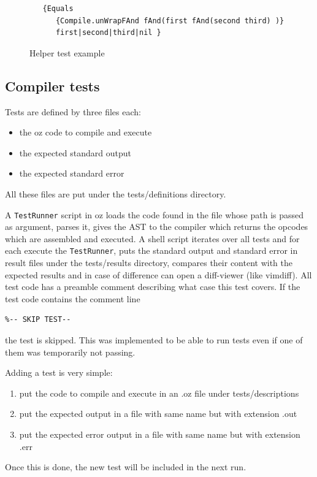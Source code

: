 \documentclass[a4paper]{memoir}
\begin{document}
\begin{figure}
\begin{lstlisting}
   {Equals 
      {Compile.unWrapFAnd fAnd(first fAnd(second third) )}
      first|second|third|nil }
\end{lstlisting}
\caption{Helper test example}
\label{fig:helperstestsexample}
\end{figure}

\pagebreak[4]
\subsection{Compiler tests}
Tests are defined by three files each:
\begin{itemize}
  \item the oz code to compile and execute
  \item the expected standard output
  \item the expected standard error
\end{itemize}
All these files are put under the tests/definitions directory.

A \lstinline!TestRunner! script in oz loads the code found in the file whose path is passed as argument, parses it, gives the AST to the compiler which returns the opcodes which are assembled and executed. 
A shell script iterates over all tests and for each execute the
\lstinline!TestRunner!, puts the standard output and standard error in result
files under the tests/results directory, compares their content with the
expected results and in case of difference can open a diff-viewer (like vimdiff).
All test code has a preamble comment describing what case this test covers.
If the test code contains the comment line
\begin{lstlisting}
%-- SKIP TEST-- 
\end{lstlisting}
the test is skipped. This was implemented to be able to run tests even if one of them was temporarily not passing.

Adding a test is very simple:
\begin{enumerate}
  \item put the code to compile and execute in an .oz file under tests/descriptions
  \item put the expected output in a file with same name but with extension .out
  \item put the expected error output in a file with same name but with extension .err
\end{enumerate}
Once this is done, the new test will be included in the next run.
\end{document}
